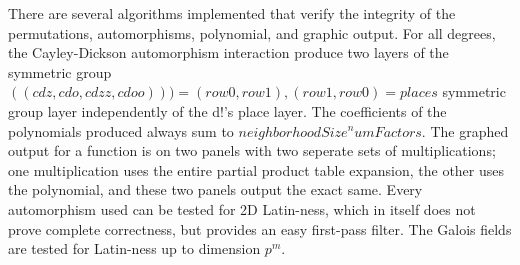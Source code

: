 \documentclass[11pt]{article}
\begin{document}
There are several algorithms implemented that verify the integrity of the permutations, automorphisms, polynomial, and graphic output. For all degrees, the Cayley-Dickson automorphism interaction produce two layers of the symmetric group $((cdz,cdo,cdzz,cdoo))) = (row0,row1),(row1,row0) = places$ symmetric group layer independently of the d!'s place layer. The coefficients of the polynomials produced always sum to $neighborhoodSize^numFactors$. The graphed output for a function is on two panels with two seperate sets of multiplications; one multiplication uses the entire partial product table expansion, the other uses the polynomial, and these two panels output the exact same. Every automorphism used can be tested for 2D Latin-ness, which in itself does not prove complete correctness, but provides an easy first-pass filter. The Galois fields are tested for Latin-ness up to dimension $p^m$. 
\end{document}
